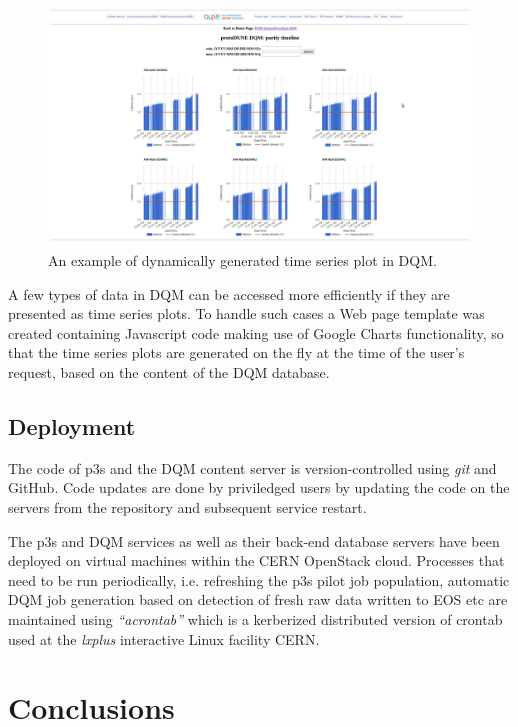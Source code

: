 \documentclass{webofc}
\begin{document}
\begin{figure}[tb]
\centering\includegraphics[width=1.0\textwidth]{figures/purity_chart_2018_v1.png}
\caption{\label{fig:purity_chart}An example of dynamically generated time series plot in DQM.}
\end{figure}

A few types of data in DQM can be accessed more efficiently if they are presented as time
series plots. To handle such cases a Web page template was created containing
Javascript code making use of Google Charts functionality, so that the time series
plots are generated on the fly at the time of the user's request, based on the content
of the DQM database.

\subsection{Deployment}

The code of p3s and the DQM content server is version-controlled using \textit{git}
and GitHub. Code updates are done by priviledged users by updating the code
on the servers from the repository and subsequent service restart.

The p3s and DQM services as well as their back-end database servers have been deployed on
virtual machines within the CERN OpenStack cloud. Processes that need to be run periodically,
i.e. refreshing the p3s pilot job population, automatic DQM job generation based on detection
of fresh raw data written to EOS etc are maintained using \textit{``acrontab''} which is a kerberized
distributed version of crontab used at the \textit{lxplus} interactive Linux facility CERN.

\section{Conclusions}
\end{document}
